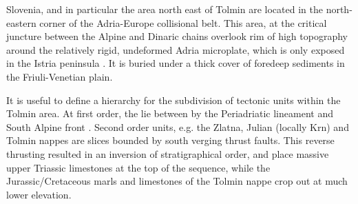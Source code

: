 Slovenia, and in particular the area north east of Tolmin are located in the north-eastern corner of the Adria-Europe collisional belt. 
This area, at the critical juncture between the Alpine and Dinaric chains overlook rim of high topography around the relatively rigid, undeformed Adria microplate, which is only exposed in the Istria peninsula \citep{vsmuc2009tectonic}. 
It is buried under a thick cover of foredeep sediments in the Friuli-Venetian plain. 

It is useful to define a hierarchy for the subdivision of tectonic units within the Tolmin area. 
At first order, the  lie between by the Periadriatic lineament and South Alpine front \citep{placer1998contribution}. 
Second order units, e.g. the Zlatna, Julian (locally Krn) and Tolmin nappes are slices bounded by south verging thrust faults. 
This reverse thrusting resulted in an inversion of stratigraphical order, and place massive upper Triassic limestones at the top of the sequence, while the Jurassic/Cretaceous marls and limestones of the Tolmin nappe crop out at much lower elevation.

